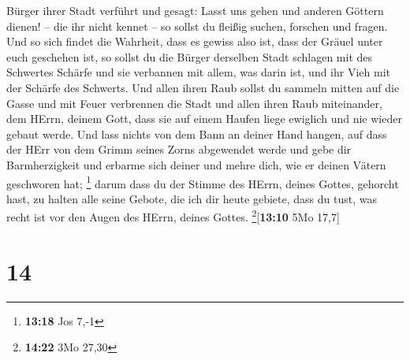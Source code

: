 Bürger ihrer Stadt verführt und gesagt: Lasst uns gehen und anderen
Göttern dienen! -- die ihr nicht kennet --  so sollst du
fleißig suchen, forschen und fragen. Und so sich findet die Wahrheit,
dass es gewiss also ist, dass der Gräuel unter euch geschehen ist,
 so sollst du die Bürger derselben Stadt schlagen mit des
Schwertes Schärfe und sie verbannen mit allem, was darin ist, und ihr
Vieh mit der Schärfe des Schwerts.  Und allen ihren Raub
sollst du sammeln mitten auf die Gasse und mit Feuer verbrennen die
Stadt und allen ihren Raub miteinander, dem HErrn, deinem Gott, dass sie
auf einem Haufen liege ewiglich und nie wieder gebaut werde.
 Und lass nichts von dem Bann an deiner Hand hangen, auf
dass der HErr von dem Grimm seines Zorns abgewendet werde und gebe dir
Barmherzigkeit und erbarme sich deiner und mehre dich, wie er deinen
Vätern geschworen hat; \footnote{\textbf{13:18} Jos 7,-1}
 darum dass du der Stimme des HErrn, deines Gottes,
gehorcht hast, zu halten alle seine Gebote, die ich dir heute gebiete,
dass du tust, was recht ist vor den Augen des HErrn, deines Gottes.
\footnote{\textbf{14:22} 3Mo 27,30}{[}\textbf{13:10} 5Mo 17,7{]}

\hypertarget{section-13}{%
\section{14}\label{section-13}}

